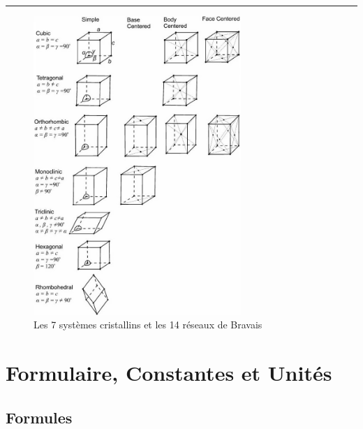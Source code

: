 \documentclass{article}
\begin{document}
\vspace{8mm}
\hrule
\vspace{3mm}
\begin{figure}[H]
    \centering
    \includegraphics[width=0.7\textwidth]{Fig/bravais.jpg}
    \caption{Les 7 systèmes cristallins et les 14 réseaux de Bravais}
    \label{fig:bravais}
\end{figure}


\section{Formulaire, Constantes et Unités}

\subsection{Formules}
\end{document}
